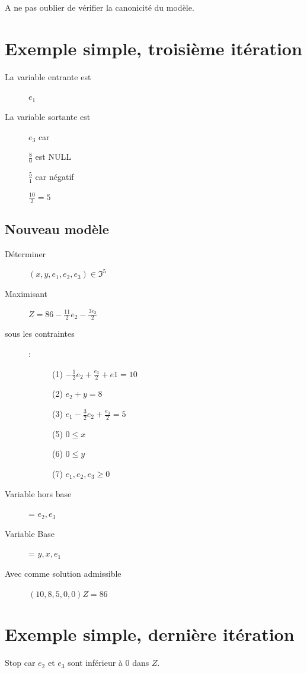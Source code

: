 A ne pas oublier de vérifier la canonicité du modèle.\\

\section{Exemple simple, troisième itération}
\begin{description}
\item[La variable entrante est] $e_1$
\item[La variable sortante est] $e_3$ car
\item[] $\frac{8}{0}$ est NULL
\item[] $\frac{5}{1}$ car négatif
\item[] $\frac{10}{2} = 5$
\end{description}

\subsection{Nouveau modèle}
\begin{description}
\item[Déterminer] $(x,y,e_1,e_2,e_3) \in \Im^5$
\item[Maximisant] $Z = 86 - \frac{11}{2}e_2 - \frac{3e_3}{2}$
\item[sous les contraintes]:
\begin{description}
\item[] (1) $- \frac{1}{2}e_2 + \frac{e_3}{2} + e1 = 10$
\item[] (2) $e_2 + y = 8$
\item[] (3) $e_1 - \frac{3}{2}e_2 + \frac{e_3}{2} = 5$
\item[] (5) $ 0 \leq x$
\item[] (6) $ 0 \leq y$
\item[] (7) $ e_1,e_2,e_3 \geq 0$
\end{description}
\item[Variable hors base] = $e_2,e_3$
\item[Variable Base] = $y,x,e_1$
\item[Avec comme solution admissible] $(10,8,5,0,0) Z=86$
\end{description}

\section{Exemple simple, dernière itération}
Stop car $e_2$ et $e_3$ sont inférieur à 0 dans $Z$.

\pagebreak